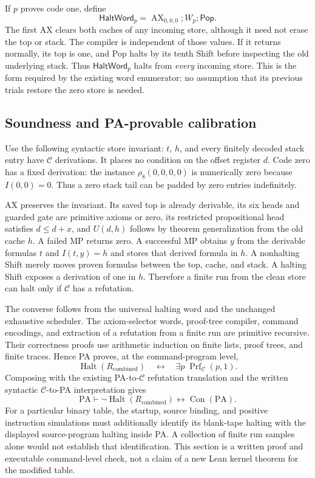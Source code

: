 If $p$ proves code one, define
\[
 \mathsf{HaltWord}_p=\operatorname{AX}_{0,0,0};W_p;\mathsf{Pop}.
\]
The first AX clears both caches of any incoming store, although it need not
erase the top or stack.  The compiler is independent of those values.  If it
returns normally, its top is one, and Pop halts by its tenth Shift before
inspecting the old underlying stack.  Thus $\mathsf{HaltWord}_p$ halts from
\emph{every} incoming store.  This is the form required by the existing word
enumerator: no assumption that its previous trials restore the zero store
is needed.

\subsection{Soundness and PA-provable calibration}

Use the following syntactic store invariant: $t$, $h$, and every finitely
decoded stack entry have $\mathcal C$ derivations.  It places no condition
on the offset register $d$.  Code zero has a fixed derivation: the instance
$\rho_8(0,0,0,0)$ is numerically zero because $I(0,0)=0$.  Thus a zero stack
tail can be padded by zero entries indefinitely.

AX preserves the invariant.  Its saved top is already derivable, its six
heads and guarded gate are primitive axioms or zero, its restricted
propositional head satisfies $d\le d+x$, and $U(d,h)$ follows by theorem
generalization from the old cache $h$.  A failed MP returns zero.  A successful
MP obtains $y$ from the derivable formulas $t$ and $I(t,y)=h$ and stores that
derived formula in $h$.  A nonhalting Shift merely moves proven formulas
between the top, cache, and stack.  A halting Shift exposes a derivation of
one in $h$.  Therefore a finite run from the clean store can halt only if
$\mathcal C$ has a refutation.

The converse follows from the universal halting word and the unchanged
exhaustive scheduler.  The axiom-selector words, proof-tree compiler,
command encodings, and extraction of a refutation from a finite run are
primitive recursive.  Their correctness proofs use arithmetic induction on
finite lists, proof trees, and finite traces.  Hence PA proves, at the
command-program level,
\[
 \operatorname{Halt}(R_{\mathrm{combined}})
 \quad\longleftrightarrow\quad
 \exists p\;\operatorname{Prf}_{\mathcal C}(p,1).
\]
Composing with the existing PA-to-$\mathcal C$ refutation translation and the
written syntactic $\mathcal C$-to-PA interpretation gives
\[
 \mathrm{PA}\vdash
 \neg\operatorname{Halt}(R_{\mathrm{combined}})
       \longleftrightarrow\operatorname{Con}(\mathrm{PA}).
\]
For a particular binary table, the startup, source binding, and positive
instruction simulations must additionally identify its blank-tape halting
with the displayed source-program halting inside PA.  A collection of finite
run samples alone would not establish that identification.  This section is
a written proof and executable command-level check, not a claim of a new
Lean kernel theorem for the modified table.


